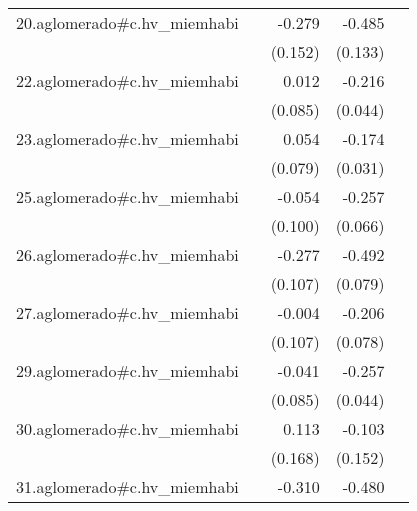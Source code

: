 {\begin{longtable}{l*{4}{D{.}{.}{-1}}}
\addlinespace
20.aglomerado#c.hv\_miemhabi&                     &      -0.279         &      -0.485\sym{***}&                     \\
            &                     &     (0.152)         &     (0.133)         &                     \\
\addlinespace
22.aglomerado#c.hv\_miemhabi&                     &       0.012         &      -0.216\sym{***}&                     \\
            &                     &     (0.085)         &     (0.044)         &                     \\
\addlinespace
23.aglomerado#c.hv\_miemhabi&                     &       0.054         &      -0.174\sym{***}&                     \\
            &                     &     (0.079)         &     (0.031)         &                     \\
\addlinespace
25.aglomerado#c.hv\_miemhabi&                     &      -0.054         &      -0.257\sym{***}&                     \\
            &                     &     (0.100)         &     (0.066)         &                     \\
\addlinespace
26.aglomerado#c.hv\_miemhabi&                     &      -0.277\sym{**} &      -0.492\sym{***}&                     \\
            &                     &     (0.107)         &     (0.079)         &                     \\
\addlinespace
27.aglomerado#c.hv\_miemhabi&                     &      -0.004         &      -0.206\sym{**} &                     \\
            &                     &     (0.107)         &     (0.078)         &                     \\
\addlinespace
29.aglomerado#c.hv\_miemhabi&                     &      -0.041         &      -0.257\sym{***}&                     \\
            &                     &     (0.085)         &     (0.044)         &                     \\
\addlinespace
30.aglomerado#c.hv\_miemhabi&                     &       0.113         &      -0.103         &                     \\
            &                     &     (0.168)         &     (0.152)         &                     \\
\addlinespace
31.aglomerado#c.hv\_miemhabi&                     &      -0.310\sym{**} &      -0.480\sym{***}&                     \\

\end{longtable}}

